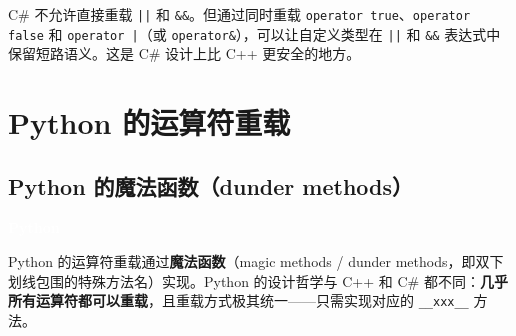 \documentclass[12pt,a4paper,fontset=fandol]{ctexbook}
\newcommand{\cpp}[1]{C++#1}
\newcommand{\csharp}{C\#}
\newcommand{\Op}[1]{\texttt{operator#1}}
\newcommand{\pythonlabel}{%
  \noindent\begin{tcolorbox}[sharp corners,colback=pythonheadbg,colframe=pythonheadbg,
    left=6pt,right=6pt,top=2pt,bottom=2pt,boxrule=0pt]
  \textcolor{white}{\small\bfseries\sffamily Python}\end{tcolorbox}%
}
\begin{document}
\begin{note}[title=C\# 的短路保护机制]
\csharp{} 不允许直接重载 \texttt{||} 和 \texttt{\&\&}。但通过同时重载 \texttt{operator true}、\texttt{operator false} 和 \texttt{operator |}（或 \Op{\&}），可以让自定义类型在 \texttt{||} 和 \texttt{\&\&} 表达式中保留短路语义。这是 \csharp{} 设计上比 \cpp{} 更安全的地方。
\end{note}

\chapter{Python 的运算符重载}

\section{Python 的魔法函数（dunder methods）}

\pythonlabel

Python 的运算符重载通过\textbf{魔法函数}（magic methods / dunder methods，即双下划线包围的特殊方法名）实现。Python 的设计哲学与 \cpp{} 和 \csharp{} 都不同：\textbf{几乎所有运算符都可以重载}，且重载方式极其统一——只需实现对应的 \texttt{\_\_xxx\_\_} 方法。
\end{document}
